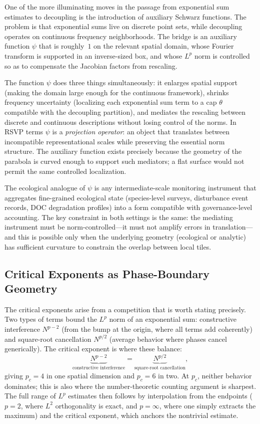 \documentclass[12pt]{article}
\begin{document}
One of the more illuminating moves in the passage from exponential sum estimates to
decoupling is the introduction of auxiliary Schwarz functions. The problem is that
exponential sums live on discrete point sets, while decoupling operates on continuous
frequency neighborhoods. The bridge is an auxiliary function $\psi$ that is roughly~$1$
on the relevant spatial domain, whose Fourier transform is supported in an inverse-sized
box, and whose $L^p$ norm is controlled so as to compensate the Jacobian factors from
rescaling.

The function $\psi$ does three things simultaneously: it enlarges spatial support (making
the domain large enough for the continuous framework), shrinks frequency uncertainty
(localizing each exponential sum term to a cap $\theta$ compatible with the decoupling
partition), and mediates the rescaling between discrete and continuous descriptions
without losing control of the norms. In RSVP terms $\psi$ is a \emph{projection
operator}: an object that translates between incompatible representational scales while
preserving the essential norm structure. The auxiliary function exists precisely because
the geometry of the parabola is curved enough to support such mediators; a flat surface
would not permit the same controlled localization.

The ecological analogue of $\psi$ is any intermediate-scale monitoring instrument that
aggregates fine-grained ecological state (species-level surveys, disturbance event records,
DOC degradation profiles) into a form compatible with governance-level accounting. The
key constraint in both settings is the same: the mediating instrument must be
norm-controlled---it must not amplify errors in translation---and this is possible only
when the underlying geometry (ecological or analytic) has sufficient curvature to constrain
the overlap between local tiles.

\subsection{Critical Exponents as Phase-Boundary Geometry}

The critical exponents arise from a competition that is worth stating precisely. Two types
of terms bound the $L^p$ norm of an exponential sum: constructive interference
$N^{p-2}$ (from the bump at the origin, where all terms add coherently) and
square-root cancellation $N^{p/2}$ (average behavior where phases cancel generically).
The critical exponent is where these balance:
\begin{equation}
\underbrace{N^{p-2}}_{\text{constructive interference}}
= \underbrace{N^{p/2}}_{\text{square-root cancellation}},
\end{equation}
giving $p_c=4$ in one spatial dimension and $p_c=6$ in two. At $p_c$, neither behavior
dominates; this is also where the number-theoretic counting argument is sharpest. The
full range of $L^p$ estimates then follows by interpolation from the endpoints ($p=2$,
where $L^2$ orthogonality is exact, and $p=\infty$, where one simply extracts the
maximum) and the critical exponent, which anchors the nontrivial estimate.
\end{document}
